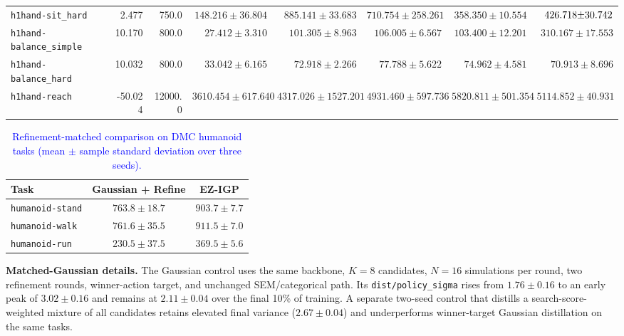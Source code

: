 \begin{table}[p]
{\begin{tabular}{lrrrrrrr}
\texttt{h1hand-sit\_hard}
& 2.477 & 750.0
& $148.216{\pm}36.804$ & $\mathbf{885.141{\pm}33.683}$ & $710.754{\pm}258.261$ & $358.350{\pm}10.554$ & $\textcolor{blue}{426.718{\pm}30.742}$ \\
\texttt{h1hand-balance\_simple}
& 10.170 & 800.0
& $27.412{\pm}3.310$ & $101.305{\pm}8.963$ & $106.005{\pm}6.567$ & $103.400{\pm}12.201$ & $\mathbf{310.167{\pm}17.553}$ \\
\texttt{h1hand-balance\_hard}
& 10.032 & 800.0
& $33.042{\pm}6.165$ & $72.918{\pm}2.266$ & $\mathbf{77.788{\pm}5.622}$ & $74.962{\pm}4.581$ & $70.913{\pm}8.696$ \\
\texttt{h1hand-reach}
& -50.024 & 12000.0
& $3610.454{\pm}617.640$ & $4317.026{\pm}1527.201$ & $4931.460{\pm}597.736$ & $\mathbf{5820.811{\pm}501.354}$ & $5114.852{\pm}40.931$ \\
\bottomrule
\end{tabular}
}
\end{table}

\begin{table}[t]
\centering
\small
\caption{\textcolor{blue}{Refinement-matched comparison on DMC humanoid tasks (mean $\pm$ sample standard deviation over three seeds).}}
\label{tab:matched_gaussian_refine}
\begin{tabular}{lcc}
\toprule
Task & Gaussian + Refine & EZ-IGP \\
\midrule
\texttt{humanoid-stand} & $763.8\pm18.7$ & $\mathbf{903.7\pm7.7}$ \\
\texttt{humanoid-walk} & $761.6\pm35.5$ & $\mathbf{911.5\pm7.0}$ \\
\texttt{humanoid-run} & $230.5\pm37.5$ & $\mathbf{369.5\pm5.6}$ \\
\bottomrule
\end{tabular}
\end{table}

\noindent\textbf{Matched-Gaussian details.}
The Gaussian control uses the same backbone, $K=8$ candidates, $N=16$
simulations per round, two refinement rounds, winner-action target, and
unchanged SEM/categorical path. Its \texttt{dist/policy\_sigma} rises from
$1.76\pm0.16$ to an early peak of $3.02\pm0.16$ and remains at
$2.11\pm0.04$ over the final 10\% of training. A separate two-seed control
that distills a search-score-weighted mixture of all candidates retains
elevated final variance ($2.67\pm0.04$) and underperforms winner-target
Gaussian distillation on the same tasks.

